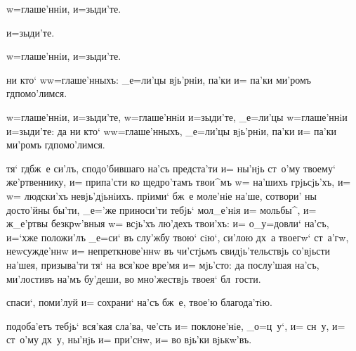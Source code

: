    w=глаше'ннiи, и=зыди'те.


 и=зыди'те.


 w=глаше'ннiи, и=зыди'те.

 ни кто` w\т w=глаше'нныхъ: _е=ли'цы вjь'рнiи, па'ки 
и= па'ки ми'ромъ гд помо'лимся.



 w=глаше'ннiи, и=зыди'те, w=глаше'ннiи 
и=зыди'те, _е=ли'цы w=глаше'ннiи и=зыди'те: да ни кто` 
w\т w=глаше'нныхъ, _е=ли'цы вjь'рнiи, па'ки и= па'ки 
ми'ромъ гд помо'лимся.



 тя` гд бж~е си'лъ, сподо'бившаго на'съ 
предста'ти и= ны'нjь ст~о'му твоему` же'ртвеннику, и= 
припа'сти ко щедро'тамъ твои^мъ w= на'шихъ грjьсjь'хъ, и= 
w= людски'хъ невjь'дjьнiихъ. прiими` бж~е моле'нiе на'ше, 
сотвори' ны досто'йны бы'ти, _е='же приноси'ти тебjь` 
мол_е'нiя и= мольбы^, и= ж_е'ртвы безкрw'вныя w= всjь'хъ 
лю'дехъ твои'хъ: и= о_у=довли` на'съ, и=`хже положи'лъ 
_е=си` въ слу'жбу твою` сiю`, си'лою дх~а твоегw` 
ст~а'гw, неwсужде'ннw и= непреткнове'ннw въ чи'стjьмъ 
свидjь'тельствjь со'вjьсти на'шея, призыва'ти тя` на 
вся'кое вре'мя и= мjь'сто: да послу'шая на'съ, ми'лостивъ 
на'мъ бу'деши, во мно'жествjь твоея` бл~гости.

 спаси`, поми'луй и= сохрани` на'съ бж~е, 
твое'ю благода'тiю.




 подоба'етъ тебjь` вся'кая сла'ва, че'сть и= 
поклоне'нiе, _о=ц~у`, и= сн~у, и= ст~о'му дх~у, ны'нjь и= 
при'снw, и= во вjь'ки вjькw'въ.

